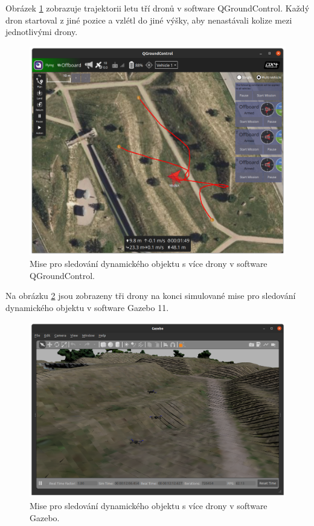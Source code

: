Obrázek \ref{fig:SIM3MULQG} zobrazuje trajektorii letu tří dronů v software QGroundControl. Každý dron startoval z jiné pozice a vzlétl do jiné výšky, aby nenastávali kolize mezi jednotlivými drony.

\begin{figure}[!ht]
  \begin{center}
    \includegraphics[scale=0.34]{obrazky/QGMULTIPLE.png}
  \end{center}
  \caption[Mise pro sledování dynamického objektu s více drony v software QGroundControl]{Mise pro sledování dynamického objektu s více drony v software QGroundControl.}
  \label{fig:SIM3MULQG}
\end{figure}

Na obrázku \ref{fig:SIM3MULGAZ} jsou zobrazeny tři drony na konci simulované mise pro sledování dynamického objektu v software Gazebo 11. 

\begin{figure}[!ht]
  \begin{center}
    \includegraphics[scale=0.33]{obrazky/GAZMULTIPLE.png}
  \end{center}
  \caption[Mise pro sledování dynamického objektu s více drony v software Gazebo]{Mise pro sledování dynamického objektu s více drony v software Gazebo.}
  \label{fig:SIM3MULGAZ}
\end{figure}

